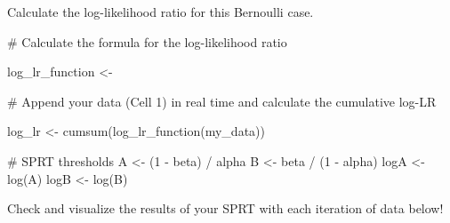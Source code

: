 \documentclass[
  letterpaper,
  DIV=11,
  numbers=noendperiod]{scrartcl}
\newenvironment{Shaded}{\begin{snugshade}}{\end{snugshade}}
\newcommand{\CommentTok}[1]{\textcolor[rgb]{0.37,0.37,0.37}{#1}}
\newcommand{\DecValTok}[1]{\textcolor[rgb]{0.68,0.00,0.00}{#1}}
\newcommand{\FunctionTok}[1]{\textcolor[rgb]{0.28,0.35,0.67}{#1}}
\newcommand{\NormalTok}[1]{\textcolor[rgb]{0.00,0.23,0.31}{#1}}
\newcommand{\OtherTok}[1]{\textcolor[rgb]{0.00,0.23,0.31}{#1}}
\newcommand{\SpecialCharTok}[1]{\textcolor[rgb]{0.37,0.37,0.37}{#1}}
\begin{document}
Calculate the log-likelihood ratio for this Bernoulli case.

\begin{Shaded}
\begin{Highlighting}[]
\CommentTok{\# Calculate the formula for the log{-}likelihood ratio}

\NormalTok{log\_lr\_function }\OtherTok{\textless{}{-}} 
\end{Highlighting}
\end{Shaded}

\begin{Shaded}
\begin{Highlighting}[]
\CommentTok{\# Append your data (Cell 1) in real time and calculate the cumulative log{-}LR}

\NormalTok{log\_lr }\OtherTok{\textless{}{-}} \FunctionTok{cumsum}\NormalTok{(}\FunctionTok{log\_lr\_function}\NormalTok{(my\_data))}
\end{Highlighting}
\end{Shaded}

\begin{Shaded}
\begin{Highlighting}[]
\CommentTok{\# SPRT thresholds}
\NormalTok{A }\OtherTok{\textless{}{-}}\NormalTok{ (}\DecValTok{1} \SpecialCharTok{{-}}\NormalTok{ beta) }\SpecialCharTok{/}\NormalTok{ alpha}
\NormalTok{B }\OtherTok{\textless{}{-}}\NormalTok{ beta }\SpecialCharTok{/}\NormalTok{ (}\DecValTok{1} \SpecialCharTok{{-}}\NormalTok{ alpha)}
\NormalTok{logA }\OtherTok{\textless{}{-}} \FunctionTok{log}\NormalTok{(A)}
\NormalTok{logB }\OtherTok{\textless{}{-}} \FunctionTok{log}\NormalTok{(B)}
\end{Highlighting}
\end{Shaded}

Check and visualize the results of your SPRT with each iteration of data
below!
\end{document}
